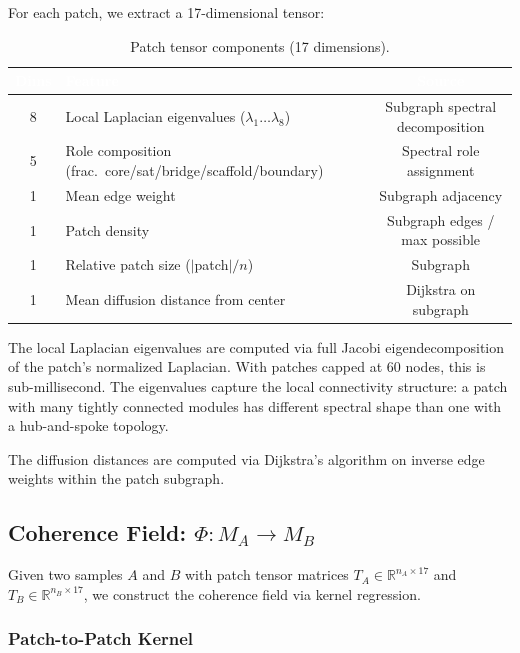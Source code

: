 \documentclass{../yalumba}
\begin{document}

For each patch, we extract a 17-dimensional tensor:

\begin{table}[H]
  \centering
  \tablestyle
  \caption{Patch tensor components (17 dimensions).}
  \label{tab:patch}
  \begin{tabular}{clc}
    \toprule
    \rowcolor{table-header}
    \textcolor{white}{\textbf{Dims}} &
    \textcolor{white}{\textbf{Feature}} &
    \textcolor{white}{\textbf{Source}} \\
    \midrule
    8 & Local Laplacian eigenvalues ($\lambda_1 \ldots \lambda_8$)
      & Subgraph spectral decomposition \\
    5 & Role composition (frac.\ core/sat/bridge/scaffold/boundary)
      & Spectral role assignment \\
    1 & Mean edge weight & Subgraph adjacency \\
    1 & Patch density & Subgraph edges / max possible \\
    1 & Relative patch size ($|$patch$|/n$) & Subgraph \\
    1 & Mean diffusion distance from center & Dijkstra on subgraph \\
    \bottomrule
  \end{tabular}
\end{table}

The local Laplacian eigenvalues are computed via full Jacobi eigendecomposition
of the patch's normalized Laplacian.  With patches capped at 60 nodes, this
is sub-millisecond.  The eigenvalues capture the local connectivity structure:
a patch with many tightly connected modules has different spectral shape than
one with a hub-and-spoke topology.

The diffusion distances are computed via Dijkstra's algorithm on inverse edge
weights within the patch subgraph.

\subsection{Coherence Field: $\Phi: M_A \to M_B$}

Given two samples $A$ and $B$ with patch tensor matrices $T_A \in
\mathbb{R}^{n_A \times 17}$ and $T_B \in \mathbb{R}^{n_B \times 17}$, we
construct the coherence field via kernel regression.

\subsubsection{Patch-to-Patch Kernel}
\end{document}
